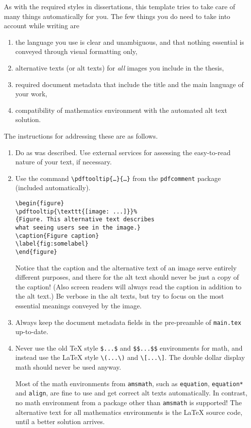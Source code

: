 As with the required styles in dissertations, this template tries to take care of many things automatically for you. The few things you do need to take into account while writing are
\begin{enumerate}
\item the language you use is clear and unambiguous, and that nothing essential is conveyed through visual formatting only,
\item alternative texts (or alt texts) for \emph{all} images you include in the thesis,
\item required document metadata that include the title and the main language of your work,
\item compatibility of mathematics environment with the automated alt text solution.
\end{enumerate}
The instructions for addressing these are as follows.
\begin{enumerate}
\item Do as was described. Use external services for assessing the easy-to-read nature of your text, if necessary.
\item Use the command \texttt{\textbackslash pdftooltip\{\ldots\}\{\ldots\}} from the \texttt{pdfcomment} package (included automatically).
\begin{verbatim}
\begin{figure}
\pdftooltip{\texttt{[image: ...]}}%
{Figure. This alternative text describes
what seeing users see in the image.}
\caption{Figure caption}
\label{fig:somelabel}
\end{figure}
\end{verbatim}
Notice that the caption and the alternative text of an image serve entirely different purposes, and there for the alt text should never be just a copy of the caption! (Also screen readers will always read the caption in addition to the alt text.) Be verbose in the alt texts, but try to focus on the most essential meanings conveyed by the image.
\item Always keep the document metadata fields in the pre-preamble of \texttt{main.tex} up-to-date.
\item Never use the old \TeX{} style \verb+$...$+ and \verb+$$...$$+ environments for math, and instead use the \LaTeX{} style \verb+\(...\)+ and \verb+\[...\]+. The double dollar display math should never be used anyway.

Most of the math environments from \texttt{amsmath}, such as \texttt{equation}, \texttt{equation*} and \texttt{align}, are fine to use and get correct alt texts automatically. In contrast, no math environment from a package other than \texttt{amsmath} is supported! The alternative text for all mathematics environments is the \LaTeX{} source code, until a better solution arrives.
\end{enumerate}

